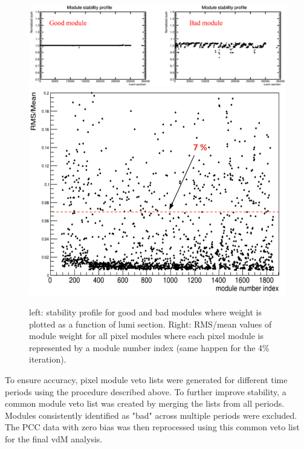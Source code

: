 \begin{center}
  \begin{figure}[h!]
    \centering
    \includegraphics[scale=.17]{Chapter4/good_module.png}\includegraphics[scale=.15]{Chapter4/RMSmean.png}
    \caption[Profile of good and bad modules stability]{ left: stability profile for good and bad modules where weight is plotted as a function of lumi section.  Right: RMS/mean values of module weight for all pixel modules  where each pixel module is represented by a module number index (same happen for the 4\% iteration).} 
    \label{goodmodule}
  \end{figure}
\end{center}

To ensure accuracy, pixel module veto lists were generated for different time periods using the procedure described above. To further improve stability, a common module veto list was created by merging the lists from all periods. Modules consistently identified as "bad" across multiple periods were excluded. The PCC data with zero bias was then reprocessed using this common veto list for the final vdM analysis.

